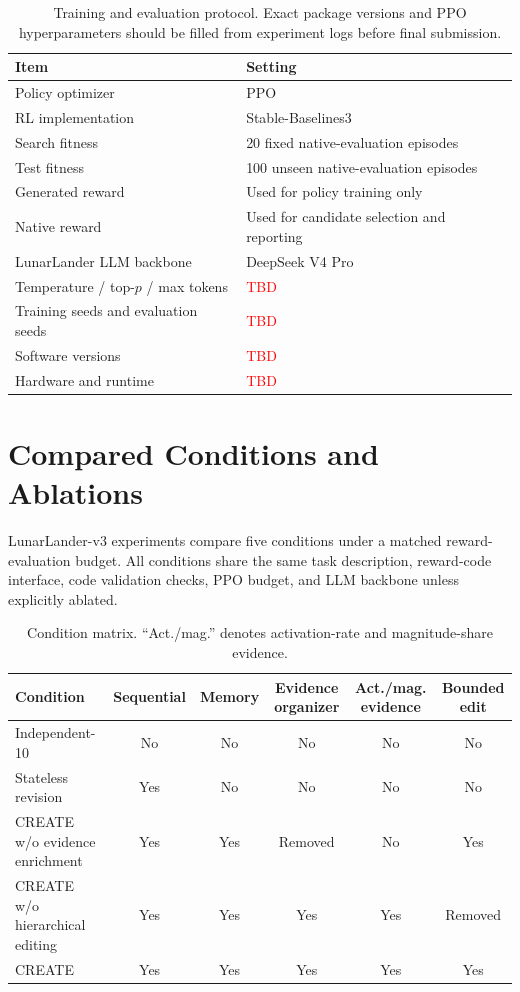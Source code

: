 \documentclass[10pt]{article}
\newcommand{\todo}{\textcolor{red}{TBD}}
\begin{document}
\begin{table}[H]
\centering
\caption{Training and evaluation protocol. Exact package versions and PPO hyperparameters should be filled from experiment logs before final submission.}
\label{tab:training}
\begin{tabular}{ll}
\toprule
Item & Setting \\
\midrule
Policy optimizer & PPO \\
RL implementation & Stable-Baselines3 \\
Search fitness & 20 fixed native-evaluation episodes \\
Test fitness & 100 unseen native-evaluation episodes \\
Generated reward & Used for policy training only \\
Native reward & Used for candidate selection and reporting \\
LunarLander LLM backbone & DeepSeek V4 Pro \\
Temperature / top-$p$ / max tokens & \todo{} \\
Training seeds and evaluation seeds & \todo{} \\
Software versions & \todo{} \\
Hardware and runtime & \todo{} \\
\bottomrule
\end{tabular}
\end{table}

\section{Compared Conditions and Ablations}

LunarLander-v3 experiments compare five conditions under a matched reward-evaluation budget. All conditions share the same task description, reward-code interface, code validation checks, PPO budget, and LLM backbone unless explicitly ablated.

\begin{table}[H]
\centering
\caption{Condition matrix. ``Act./mag.'' denotes activation-rate and magnitude-share evidence.}
\label{tab:conditions}
\small
\begin{tabular}{lccccc}
\toprule
Condition & Sequential & Memory & Evidence organizer & Act./mag. evidence & Bounded edit \\
\midrule
Independent-10 & No & No & No & No & No \\
Stateless revision & Yes & No & No & No & No \\
CREATE w/o evidence enrichment & Yes & Yes & Removed & No & Yes \\
CREATE w/o hierarchical editing & Yes & Yes & Yes & Yes & Removed \\
CREATE & Yes & Yes & Yes & Yes & Yes \\
\bottomrule
\end{tabular}
\end{table}
\end{document}
